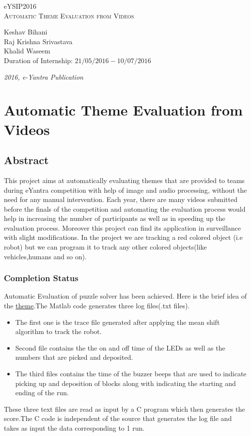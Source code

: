\documentclass[a4paper,12pt,oneside]{book}
\begin{document}
\begin{titlepage}
\raggedright
{\Large eYSIP2016\\[1cm]}
{\Huge\scshape Automatic Theme Evaluation from Videos \\[.1in]}
\vfill
\begin{flushright}
{\large Keshav Bihani \\}
{\large Raj Krishna Srivastava \\}
{\large Khalid Waseem \\}
{\large Duration of Internship: $ 21/05/2016-10/07/2016 $ \\}
\end{flushright}

{\itshape 2016, e-Yantra Publication}
\end{titlepage}

\chapter[Project Tag]{Automatic Theme Evaluation from Videos}
\section*{Abstract}
This project aims at automatically evaluating themes that are provided to teams during eYantra competition with help of image and audio processing, without the need for any manual intervention.
Each year, there are many videos submitted before the finals of the competition and automating the evaluation process would help in increasing the number of participants as well as in speeding up the evaluation process. Moreover this project can find its application in surveillance with slight modifications. In the project we are tracking a red colored object (i.e robot) but we can program it to track any other colored objects(like vehicles,humans and so on).

\subsection*{Completion Status}
Automatic Evaluation of puzzle solver has been achieved. Here is the brief idea of the \href{https://www.youtube.com/watch?v=didlhJrfUUA}{theme}.The Matlab code generates three log files(.txt files).
\begin{itemize}
  \item The first one is the trace file generated after applying the mean shift algorithm to track the robot.
  \item Second file contains the the on and off time of the LEDs as well as the numbers that are picked and deposited.
  \item The third files contains the time of the buzzer beeps that are used to indicate picking up and deposition of blocks along with indicating the starting and ending of the run.
\end{itemize} 
These three text files are read as input by a C program which then generates the score.The C code is independent of the source that generates the log file and takes as input the data corresponding to 1 run. 
\end{document}
